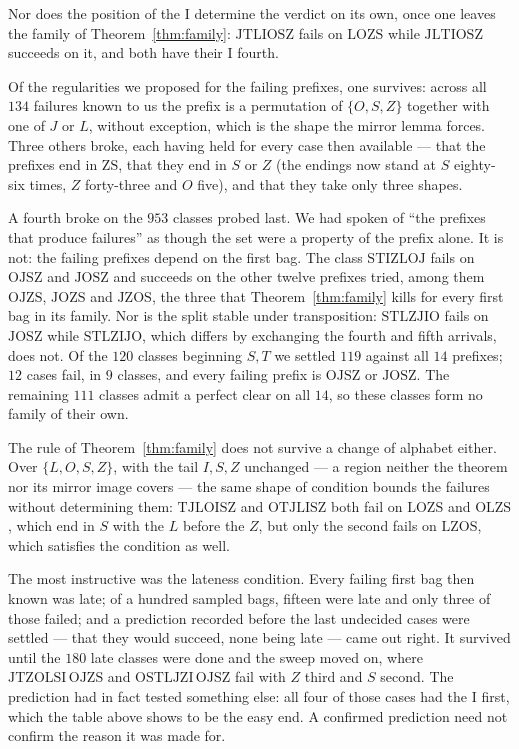 \documentclass[11pt,a4paper]{article}
\theoremstyle{plain}
\theoremstyle{definition}
\theoremstyle{remark}
\begin{document}
Nor does the position of the I determine the verdict on its own, once one leaves the
family of Theorem~\ref{thm:family}: $\mathrm{JTLIOSZ}$ fails on $\mathrm{LOZS}$ while
$\mathrm{JLTIOSZ}$ succeeds on it, and both have their I fourth.

Of the regularities we proposed for the failing prefixes, one survives: across all
$134$ failures known to us the prefix is a permutation of $\{O,S,Z\}$ together with one
of $J$ or $L$, without exception, which is the shape the mirror lemma forces. Three
others broke, each having held for every case then available --- that the prefixes end
in $\mathrm{ZS}$, that they end in $S$ or $Z$ (the endings now stand at $S$ eighty-six
times, $Z$ forty-three and $O$ five), and that they take only three shapes.

A fourth broke on the $953$ classes probed last. We had spoken of ``the prefixes that
produce failures'' as though the set were a property of the prefix alone. It is not: the
failing prefixes depend on the first bag. The class $\mathrm{STIZLOJ}$ fails on
$\mathrm{OJSZ}$ and $\mathrm{JOSZ}$ and succeeds on the other twelve prefixes tried,
among them $\mathrm{OJZS}$, $\mathrm{JOZS}$ and $\mathrm{JZOS}$, the three that
Theorem~\ref{thm:family} kills for every first bag in its family. Nor is the split
stable under transposition: $\mathrm{STLZJIO}$ fails on $\mathrm{JOSZ}$ while
$\mathrm{STLZIJO}$, which differs by exchanging the fourth and fifth arrivals, does
not. Of the $120$ classes beginning $S, T$ we settled $119$ against all $14$ prefixes;
$12$ cases fail, in $9$ classes, and every failing prefix is $\mathrm{OJSZ}$ or
$\mathrm{JOSZ}$. The remaining $111$ classes admit a perfect clear on all $14$, so
these classes form no family of their own.

The rule of Theorem~\ref{thm:family} does not survive a change of alphabet either. Over
$\{L, O, S, Z\}$, with the tail $I, S, Z$ unchanged --- a region neither the theorem nor
its mirror image covers --- the same shape of condition bounds the failures without
determining them: $\mathrm{TJLOISZ}$ and $\mathrm{OTJLISZ}$ both fail on
$\mathrm{LOZS}$ and $\mathrm{OLZS}$, which end in $S$ with the $L$ before the $Z$, but
only the second fails on $\mathrm{LZOS}$, which satisfies the condition as well.

The most instructive was the lateness condition. Every failing first bag then known
was late; of a hundred sampled bags, fifteen were late and only three of those failed;
and a prediction recorded before the last undecided cases were settled --- that they
would succeed, none being late --- came out right. It survived until the $180$ late
classes were done and the sweep moved on, where $\mathrm{JTZOLSI}\,\mathrm{OJZS}$ and
$\mathrm{OSTLJZI}\,\mathrm{OJSZ}$ fail with $Z$ third and $S$ second. The prediction
had in fact tested something else: all four of those cases had the I first, which the
table above shows to be the easy end. A confirmed prediction need not confirm the
reason it was made for.
\end{document}
